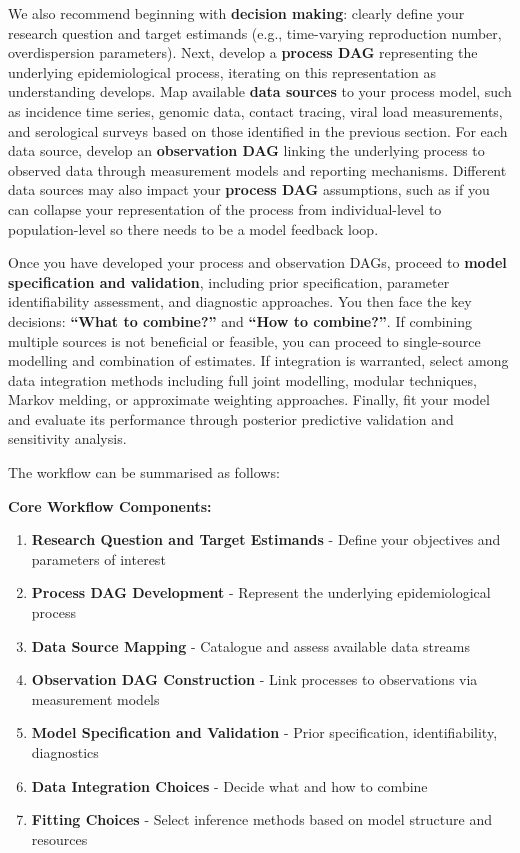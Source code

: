 \documentclass{article}
\begin{document}
We also recommend beginning with \textbf{decision making}: clearly define your research question and target estimands (e.g., time-varying reproduction number, overdispersion parameters).
Next, develop a \textbf{process DAG} representing the underlying epidemiological process, iterating on this representation as understanding develops.
Map available \textbf{data sources} to your process model, such as incidence time series, genomic data, contact tracing, viral load measurements, and serological surveys based on those identified in the previous section.
For each data source, develop an \textbf{observation DAG} linking the underlying process to observed data through measurement models and reporting mechanisms.
Different data sources may also impact your \textbf{process DAG} assumptions, such as if you can collapse your representation of the process from individual-level to population-level so there needs to be a model feedback loop.

Once you have developed your process and observation DAGs, proceed to \textbf{model specification and validation}, including prior specification, parameter identifiability assessment, and diagnostic approaches.
You then face the key decisions: \textbf{``What to combine?''} and \textbf{``How to combine?''}.
If combining multiple sources is not beneficial or feasible, you can proceed to single-source modelling and combination of estimates.
If integration is warranted, select among data integration methods including full joint modelling, modular techniques, Markov melding, or approximate weighting approaches.
Finally, fit your model and evaluate its performance through posterior predictive validation and sensitivity analysis.

The workflow can be summarised as follows:

\textbf{Core Workflow Components:}
\begin{enumerate}
    \item \textbf{Research Question and Target Estimands} - Define your objectives and parameters of interest
    \item \textbf{Process DAG Development} - Represent the underlying epidemiological process
    \item \textbf{Data Source Mapping} - Catalogue and assess available data streams
    \item \textbf{Observation DAG Construction} - Link processes to observations via measurement models
    \item \textbf{Model Specification and Validation} - Prior specification, identifiability, diagnostics
    \item \textbf{Data Integration Choices} - Decide what and how to combine
    \item \textbf{Fitting Choices} - Select inference methods based on model structure and resources
\end{enumerate}
\end{document}
